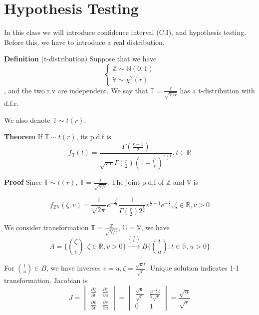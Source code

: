 \section{Hypothesis Testing}
In this class we will introduce confidence interval (C.I), and hypothesis testing. Before this, we have to introduce a real distribution.

\textbf{Definition} (t-distribution) Suppose that we have
$$
\begin{cases}
\mathbb{Z} \sim \mathbb{N}(0, 1) \\
\mathbb{V} \sim \mathbb{\chi}^2(r)
\end{cases}
$$
, and the two r.v are independent. We say that $\mathbb{T} = \frac{\mathbb{Z}}{\sqrt{\mathbb{V}/r}}$ has a t-distribution with d.f.r.

We also denote $\mathbb{T}\sim t(r)$.

\textbf{Theorem} If  $\mathbb{T}\sim t(r)$, its p.d.f is
$$f_\mathbb{T}(t) = \frac{\Gamma(\frac{r+1}{2})}{\sqrt{\pi r}\Gamma(\frac{r}{2})(1+\frac{t^2}{r})^\frac{r+1}{2}}, t\in\mathbb{R}$$

\textbf{Proof} Since $\mathbb{T}\sim t(r)$, $\mathbb{T} = \frac{\mathbb{Z}}{\sqrt{\mathbb{V}/r}}$. The joint p.d.f of $\mathbb{Z}$ and $\mathbb{V}$ is

$$f_{\mathbb{Z}\mathbb{V}}(\zeta, v) = 
\frac{1}{\sqrt{2\pi}} e^{-\frac{\zeta^2}{2}} \frac{1}{\Gamma(\frac{r}{2})2^{\frac{r}{2}}}v^{\frac{r}{2}-1}e^{-\frac{v}{2}}
, \zeta\in\mathbb{R}, v>0 $$

We consider transformation $\mathbb{T} = \frac{\mathbb{Z}}{\sqrt{\mathbb{V}/r}}$, $\mathbb{U} = \mathbb{V}$, we have
$$A = \big\{ {\zeta \choose v}: \zeta\in\mathbb{R}, v>0 \big\} \overset{{\mathbb{T} \choose \mathbb{U}}}{\to} B \big\{ {t \choose u}:t\in\mathbb{R}, u>0 \big\}$$

For ${t \choose u} \in B$, we have inverses $v=u, \zeta=\frac{\sqrt{u}t}{\sqrt{r}}$. Unique solution indicates 1-1 transformation. Jacobian is
$$J = 
\begin{vmatrix}
\frac{\partial \zeta}{\partial t} & \frac{\partial \zeta}{\partial u} \\
\frac{\partial v}{\partial t} & \frac{\partial v}{\partial u}
\end{vmatrix} = 
\begin{vmatrix}
\frac{\sqrt{u}}{\sqrt{r}} & \frac{u^{-\frac{1}{2}}t}{2\sqrt{r}} \\
0 & 1
\end{vmatrix}
= \frac{\sqrt{u}}{\sqrt{r}}$$

